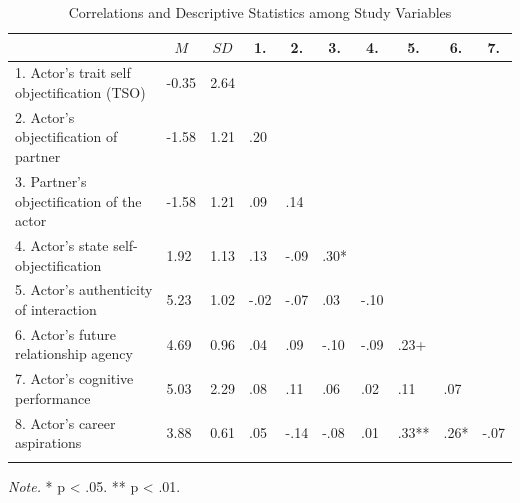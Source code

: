 \documentclass[man]{apa6}
\begin{document}
\begin{table}[tbp]
\begin{center}
\begin{threeparttable}
\caption{\label{tab:corrtable}Correlations and Descriptive Statistics among Study Variables}
\begin{tabular}{llllllllll}
\toprule
 & \multicolumn{1}{c}{$M$} & \multicolumn{1}{c}{$SD$} & \multicolumn{1}{c}{1.} & \multicolumn{1}{c}{2.} & \multicolumn{1}{c}{3.} & \multicolumn{1}{c}{4.} & \multicolumn{1}{c}{5.} & \multicolumn{1}{c}{6.} & \multicolumn{1}{c}{7.}\\
\midrule
1. Actor's trait self objectification (TSO) & -0.35 & 2.64 &  &  &  &  &  &  & \\
2. Actor's objectification of partner & -1.58 & 1.21 & .20 &  &  &  &  &  & \\
3. Partner's objectification of the actor & -1.58 & 1.21 & .09 & .14 &  &  &  &  & \\
4. Actor's state self-objectification & 1.92 & 1.13 & .13 & -.09 & .30* &  &  &  & \\
5. Actor's authenticity of interaction & 5.23 & 1.02 & -.02 & -.07 & .03 & -.10 &  &  & \\
6. Actor's future relationship agency & 4.69 & 0.96 & .04 & .09 & -.10 & -.09 & .23+ &  & \\
7. Actor's cognitive performance & 5.03 & 2.29 & .08 & .11 & .06 & .02 & .11 & .07 & \\
8. Actor's career aspirations & 3.88 & 0.61 & .05 & -.14 & -.08 & .01 & .33** & .26* & -.07\\
\bottomrule
\addlinespace
\end{tabular}
\begin{tablenotes}[para]
\normalsize{\textit{Note.} * p < .05. ** p < .01.}
\end{tablenotes}
\end{threeparttable}
\end{center}
\end{table}
\end{document}
